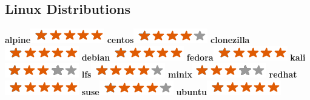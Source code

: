 \documentclass[]{friggeri-cv}
\begin{document}
\begin{aside}
    \section{Linux Distributions}
        \textbf{alpine}\includegraphics[scale=0.40]{img/5stars.png}
        \textbf{centos}\includegraphics[scale=0.40]{img/4stars.png}
        \textbf{clonezilla}\includegraphics[scale=0.40]{img/5stars.png}
        \textbf{debian}\includegraphics[scale=0.40]{img/5stars.png}
        \textbf{fedora}\includegraphics[scale=0.40]{img/5stars.png}
        \textbf{kali}\includegraphics[scale=0.40]{img/3stars.png}
        \textbf{lfs}\includegraphics[scale=0.40]{img/4stars.png}
        \textbf{minix}\includegraphics[scale=0.40]{img/3stars.png}
        \textbf{redhat}\includegraphics[scale=0.40]{img/5stars.png}
        \textbf{suse}\includegraphics[scale=0.40]{img/4stars.png}
        \textbf{ubuntu}\includegraphics[scale=0.40]{img/5stars.png}
        ~

\end{aside}
\end{document}
